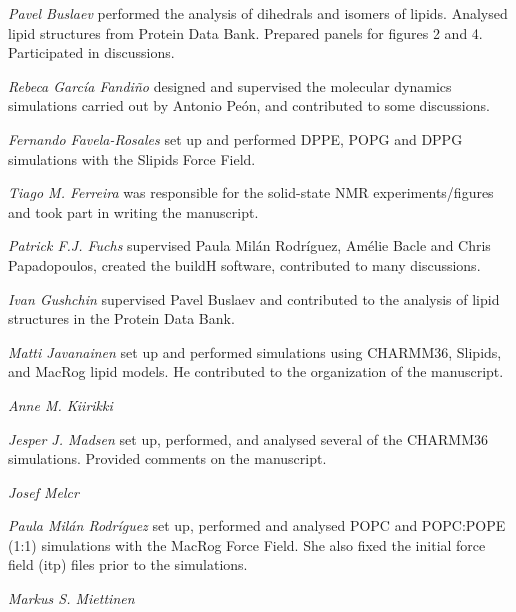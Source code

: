 \documentclass[journal=jpcbfk]{achemso}
\begin{document}
\noindent
{\it Pavel Buslaev}
performed the analysis of dihedrals and isomers of lipids. Analysed lipid structures from Protein Data Bank. Prepared panels for figures 2 and 4. Participated in discussions.

\noindent
{\it Rebeca Garc{\'i}a Fandi{\~n}o}
designed and supervised the molecular dynamics simulations carried out by Antonio Pe{\'o}n, and contributed to some discussions.

\noindent
{\it Fernando Favela-Rosales} 
set up and performed DPPE, POPG and DPPG simulations with the Slipids Force Field.

\noindent
{\it Tiago M. Ferreira}
was responsible for the solid-state NMR experiments/figures and took part in writing the manuscript.

\noindent
{\it Patrick F.J. Fuchs} supervised Paula Mil{\'a}n Rodr{\'i}guez, Am{\'e}lie Bacle and Chris Papadopoulos, created the buildH software, contributed to many discussions.

\noindent
{\it Ivan Gushchin} supervised Pavel Buslaev and contributed to the analysis of lipid structures in the Protein Data Bank.

\noindent
{\it Matti Javanainen} set up and performed simulations using CHARMM36, Slipids, and MacRog lipid models. He contributed to the organization of the manuscript.

\noindent
{\it Anne M. Kiirikki}

\noindent
{\it Jesper J. Madsen}
set up, performed, and analysed several of the CHARMM36 simulations.
Provided comments on the manuscript.

\noindent
{\it Josef Melcr}

\noindent
{\it Paula Mil{\'a}n Rodr{\'i}guez} set up, performed and analysed POPC and POPC:POPE (1:1) simulations with the MacRog Force Field. She also fixed the initial force field (itp) files prior to the simulations.

\noindent
{\it Markus S. Miettinen}
\end{document}
